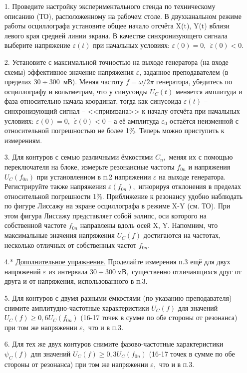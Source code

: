 \begin{lab:task}
	\begin{enumerate}
    \item[1.] Проведите настройку экспериментального стенда по техническому описанию (ТО), расположенному на рабочем столе. В двухканальном режиме работы осциллографа установите общее начало отсчёта X(t), Y(t) вблизи левого края средней линии экрана. В качестве синхронизующего сигнала выберите напряжение $\varepsilon(t)$ при начальных условиях: $\varepsilon(0)=0,~~\dot{\varepsilon}(0)<0.$
    \item[2.] Установите с максимальной точностью на выходе генератора (на входе схемы) эффективное значение напряжения $\varepsilon$, заданное преподавателем (в пределах $30\div300$~мВ). Меняя частоту $f=\omega/2\pi$ генератора, убедитесь по осциллографу и вольтметрам, что у синусоиды $U_C(t)$ меняется амплитуда и фаза относительно начала координат, тогда как синусоида $\varepsilon(t)$ – синхронизующий сигнал – <<привязана>> к началу отсчёта при начальных условиях: $\varepsilon(0)=0,~~\dot{\varepsilon}(0)<0$ – а её амплитуда $\varepsilon_0$ остаётся неизменной с относительной погрешностью не более 1\%. Теперь можно приступить к измерениям.
    \item[3.] Для контуров с семью различными ёмкостями $C_n,$ меняя их с помощью переключателя на блоке, измерьте резонансные частоты $f_{0n}$ и напряжения $U_C(f_{0n})$ при установленном в п.2 напряжении $\varepsilon$ на выходе генератора. Регистрируйте также напряжения $\varepsilon(f_{0n}),$ игнорируя отклонения в пределах относительной погрешности 1\%. Приближение к резонансу удобно наблюдать по фигуре Лиссажу на экране осциллографа в режиме X-Y (см. ТО). При этом фигура Лиссажу представляет собой эллипс, оси которого на собственной частоте $f_{0n}$ направлены вдоль осей X, Y. Напомним, что максимальные значения напряжения $U_C(f)$ достигаются на частотах, несколько отличных от собственных частот $f_{0n}.$
    \item[4.*] \underline{Дополнительное упражнение.} Проделайте измерения п.3 ещё для двух напряжений $\varepsilon$ из интервала $30\div 300~мВ,$ существенно отличающихся друг от друга и от напряжения, использованного в п.3.
    \item[5.] Для контуров с двумя разными ёмкостями (по указанию преподавателя) снимите амплитудно-частотные характеристики $U_C(f)$ для значений $U_C(f)\ge0,6U_C(f_{0n})$ (16-17 точек в сумме по обе стороны от резонанса) при том же напряжении $\varepsilon,$ что и в п.3.
    \item[6.] Для тех же двух контуров снимите фазово-частотные характеристики $\psi_C(f)$ для значений $U_C(f)\ge0,3U_C(f_{0n})$ (16-17 точек в сумме по обе стороны от резонанса) при том же напряжении $\varepsilon,$ что и в п.3.


\end{enumerate}
\end{lab:task}
